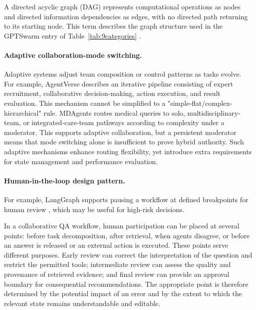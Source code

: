 \documentclass[a4paper,fleqn]{cas-dc}
\begin{document}
A directed acyclic graph (DAG) represents computational operations as nodes
and directed information dependencies as edges, with no directed path
returning to its starting node. This term describes the graph structure
used in the GPTSwarm entry of Table~\ref{tab:9categories}
\citep{zhuge2024gptswarm}.

\paragraph{Adaptive collaboration-mode switching.}
\label{sec:adaptive}

Adaptive systems adjust team composition or control patterns as tasks evolve.
For example, AgentVerse \citep{chen2024agentverse} describes an iterative pipeline consisting of
expert recruitment, collaborative decision-making, action execution, and
result evaluation. This mechanism cannot be simplified to a "simple-flat/complex-
hierarchical" rule. MDAgents \citep{kim2024mdagents} routes medical queries to
solo, multidisciplinary-team, or integrated-care-team pathways according to
complexity under a moderator. This supports adaptive collaboration, but a
persistent moderator means that mode switching alone is insufficient to prove
hybrid authority. Such adaptive mechanisms enhance routing flexibility, yet
introduce extra requirements for state management and performance evaluation.

\paragraph{Human-in-the-loop design pattern.}
\label{sec:hitl}

For example, LangGraph supports pausing a workflow at defined breakpoints for
human review \citep{langgraph2024interrupt}, which may be useful for high-risk
decisions.

In a collaborative QA workflow, human participation can be placed at several
points: before task decomposition, after retrieval, when agents disagree, or
before an answer is released or an external action is executed. These points
serve different purposes. Early review can correct the interpretation of the
question and restrict the permitted tools; intermediate review can assess the
quality and provenance of retrieved evidence; and final review can provide an
approval boundary for consequential recommendations. The appropriate point is
therefore determined by the potential impact of an error and by the extent to
which the relevant state remains understandable and editable.
\end{document}
